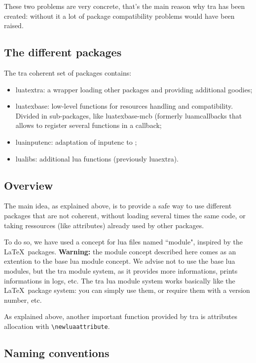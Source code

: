 \documentclass{article}
\newcommand\pf{\textsf}
\begin{document}
These two problems are very concrete, that's the main reason why \LuaTeX tra
has been created: without it a lot of package compatibility problems would
have been raised.

\subsection{The different packages}

The \LuaTeX tra coherent set of packages contains:

\begin{itemize}
  \item \pf{luatextra}: a wrapper loading other packages and providing
    additional goodies;
  \item \pf{luatexbase}: low-level functions for resources handling and
    compatibility. Divided in sub-packages, like \pf{luatexbase-mcb} (formerly
    \pf{luamcallbacks} that allows to register several functions in a
    callback;
  \item \pf{luainputenc}: adaptation of \pf{inputenc} to \LuaTeX;
  \item \pf{lualibs}: additional lua functions (previously \pf{luaextra}).
\end{itemize}

\subsection{Overview}

The main idea, as explained above, is to provide a safe way to use different
packages that are not coherent, without loading several times the same code,
or taking ressources (like attributes) already used by other packages.

To do so, we have used a concept for lua files named ``module", inspired by
the \LaTeX\ packages. \textbf{Warning:} the module concept described here
comes as an extention to the base lua module concept. We advise not to use the
base lua modules, but the \LuaTeX tra module system, as it provides more
informations, prints informations in logs, etc. The \LuaTeX tra lua module
system works basically like the \LaTeX\ package system: you can simply use
them, or require them with a version number, etc.

As explained above, another important function provided by \LuaTeX tra is
attributes allocation with \verb+\newluaattribute+.

\subsection{Naming conventions}
\end{document}
